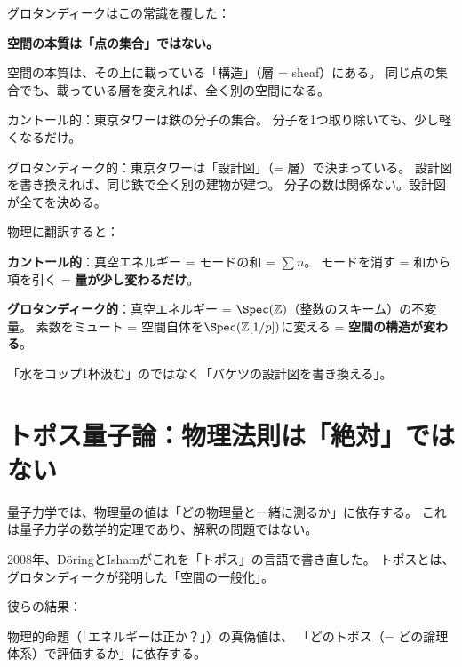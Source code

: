 \documentclass[12pt,a4paper]{article}
\begin{document}
グロタンディークはこの常識を覆した：

\begin{deepbox}[グロタンディークの革命]
\textbf{空間の本質は「点の集合」ではない。}

空間の本質は、その上に載っている「構造」（層 = sheaf）にある。
同じ点の集合でも、載っている層を変えれば、全く別の空間になる。
\end{deepbox}

\begin{storybox}
カントール的：東京タワーは鉄の分子の集合。
分子を1つ取り除いても、少し軽くなるだけ。

グロタンディーク的：東京タワーは「設計図」（= 層）で決まっている。
設計図を書き換えれば、同じ鉄で全く別の建物が建つ。
分子の数は関係ない。設計図が全てを決める。
\end{storybox}

物理に翻訳すると：

\textbf{カントール的}：真空エネルギー = モードの和 = $\sum n$。
モードを消す = 和から項を引く = \textbf{量が少し変わるだけ}。

\textbf{グロタンディーク的}：真空エネルギー = $\Spec(\mathbb{Z})$（整数のスキーム）の不変量。
素数をミュート = 空間自体を$\Spec(\mathbb{Z}[1/p])$に変える = \textbf{空間の構造が変わる}。

「水をコップ1杯汲む」のではなく「バケツの設計図を書き換える」。

\section{トポス量子論：物理法則は「絶対」ではない}

\begin{deepbox}
量子力学では、物理量の値は「どの物理量と一緒に測るか」に依存する。
これは量子力学の数学的定理であり、解釈の問題ではない。
\end{deepbox}

2008年、DöringとIshamがこれを「トポス」の言語で書き直した。
トポスとは、グロタンディークが発明した「空間の一般化」。

彼らの結果：

物理的命題（「エネルギーは正か？」）の真偽値は、
「どのトポス（= どの論理体系）で評価するか」に依存する。
\end{document}
